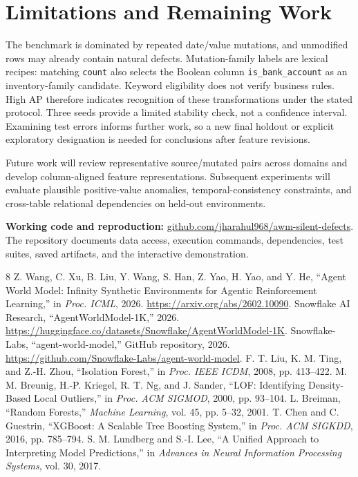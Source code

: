 \documentclass[conference]{IEEEtran}
\begin{document}
\section{Limitations and Remaining Work}
The benchmark is dominated by repeated date/value mutations, and unmodified rows may already contain natural defects. Mutation-family labels are lexical recipes: matching \texttt{count} also selects the Boolean column \texttt{is\_bank\_account} as an inventory-family candidate. Keyword eligibility does not verify business rules. High AP therefore indicates recognition of these transformations under the stated protocol. Three seeds provide a limited stability check, not a confidence interval. Examining test errors informs further work, so a new final holdout or explicit exploratory designation is needed for conclusions after feature revisions.

Future work will review representative source/mutated pairs across domains and develop column-aligned feature representations. Subsequent experiments will evaluate plausible positive-value anomalies, temporal-consistency constraints, and cross-table relational dependencies on held-out environments.

\textbf{Working code and reproduction:} \href{https://github.com/jharahul968/awm-silent-defects}{github.com/jharahul968/awm-silent-defects}. The repository documents data access, execution commands, dependencies, test suites, saved artifacts, and the interactive demonstration.

\begin{thebibliography}{8}
 Z. Wang, C. Xu, B. Liu, Y. Wang, S. Han, Z. Yao, H. Yao, and Y. He, ``Agent World Model: Infinity Synthetic Environments for Agentic Reinforcement Learning,'' in \emph{Proc. ICML}, 2026. \url{https://arxiv.org/abs/2602.10090}.
 Snowflake AI Research, ``AgentWorldModel-1K,'' 2026. \url{https://huggingface.co/datasets/Snowflake/AgentWorldModel-1K}.
 Snowflake-Labs, ``agent-world-model,'' GitHub repository, 2026. \url{https://github.com/Snowflake-Labs/agent-world-model}.
 F. T. Liu, K. M. Ting, and Z.-H. Zhou, ``Isolation Forest,'' in \emph{Proc. IEEE ICDM}, 2008, pp. 413--422.
 M. M. Breunig, H.-P. Kriegel, R. T. Ng, and J. Sander, ``LOF: Identifying Density-Based Local Outliers,'' in \emph{Proc. ACM SIGMOD}, 2000, pp. 93--104.
 L. Breiman, ``Random Forests,'' \emph{Machine Learning}, vol. 45, pp. 5--32, 2001.
 T. Chen and C. Guestrin, ``XGBoost: A Scalable Tree Boosting System,'' in \emph{Proc. ACM SIGKDD}, 2016, pp. 785--794.
 S. M. Lundberg and S.-I. Lee, ``A Unified Approach to Interpreting Model Predictions,'' in \emph{Advances in Neural Information Processing Systems}, vol. 30, 2017.
\end{thebibliography}
\end{document}

